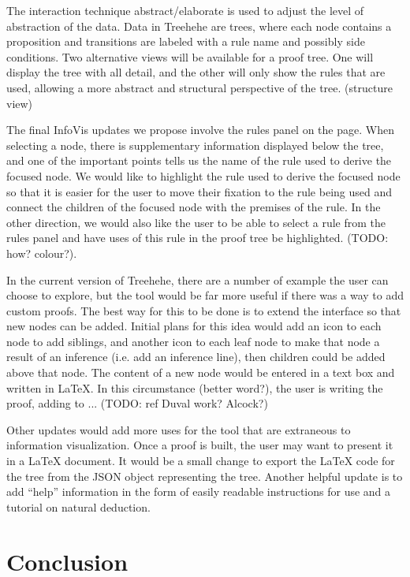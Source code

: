 \documentclass[conference]{IEEEtran}
\newcommand{\projectname}{Treehehe}
\begin{document}
The interaction technique abstract/elaborate is used to adjust the level of abstraction of the data. Data in \projectname{} are trees, where each node contains a proposition and transitions are labeled with a rule name and possibly side conditions. Two alternative views will be available for a proof tree. One will display the tree with all detail, and the other will only show the rules that are used, allowing a more abstract and structural perspective of the tree. (structure view)

The final InfoVis updates we propose involve the rules panel on the page. When selecting a node, there is supplementary information displayed below the tree, and one of the important points tells us the name of the rule used to derive the focused node. We would like to highlight the rule used to derive the focused node so that it is easier for the user to move their fixation to the rule being used and connect the children of the focused node with the premises of the rule. In the other direction, we would also like the user to be able to select a rule from the rules panel and have uses of this rule in the proof tree be highlighted. (TODO: how? colour?).

In the current version of \projectname{}, there are a number of example the user can choose to explore, but the tool would be far more useful if there was a way to add custom proofs. The best way for this to be done is to extend the interface so that new nodes can be added. Initial plans for this idea would add an icon to each node to add siblings, and another icon to each leaf node to make that node a result of an inference (i.e. add an inference line), then children could be added above that node. The content of a new node would be entered in a text box and written in \LaTeX{}. In this circumstance (better word?), the user is writing the proof, adding to ... (TODO: ref Duval work? Alcock?)

Other updates would add more uses for the tool that are extraneous to information visualization. Once a proof is built, the user may want to present it in a \LaTeX{} document. It would be a small change to export the \LaTeX{} code for the tree from the JSON object representing the tree. Another helpful update is to add ``help'' information in the form of easily readable instructions for use and a tutorial on natural deduction.

\section{Conclusion}
\label{sec:conclusion}
\end{document}
